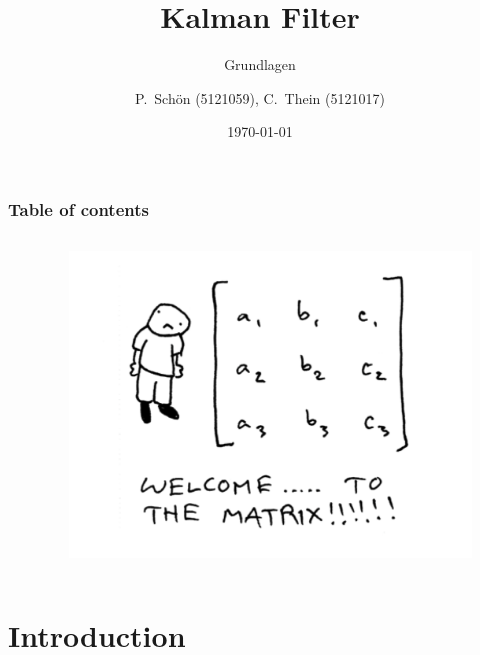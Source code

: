 \documentclass{beamer}
\title{Kalman Filter}
\subtitle{Grundlagen}
\author{P.~Schön (5121059), C.~Thein (5121017)}
\date{\today}
\begin{document}
\frame{\titlepage}

\begin{frame}
    \frametitle{Table of contents}
    \begin{columns}
        \begin{column}{0.4\textwidth}
            \tableofcontents
        \end{column}
        \begin{column}{0.4\textwidth}
            \begin{figure}
                \centering
                \includegraphics[width=1\textwidth]{images/graphics/Bildschirmfoto 2024-06-02 um 16.40.09.png}
            \end{figure} 
        \end{column}
    \end{columns}
\end{frame}

\section{Introduction}
\end{document}
